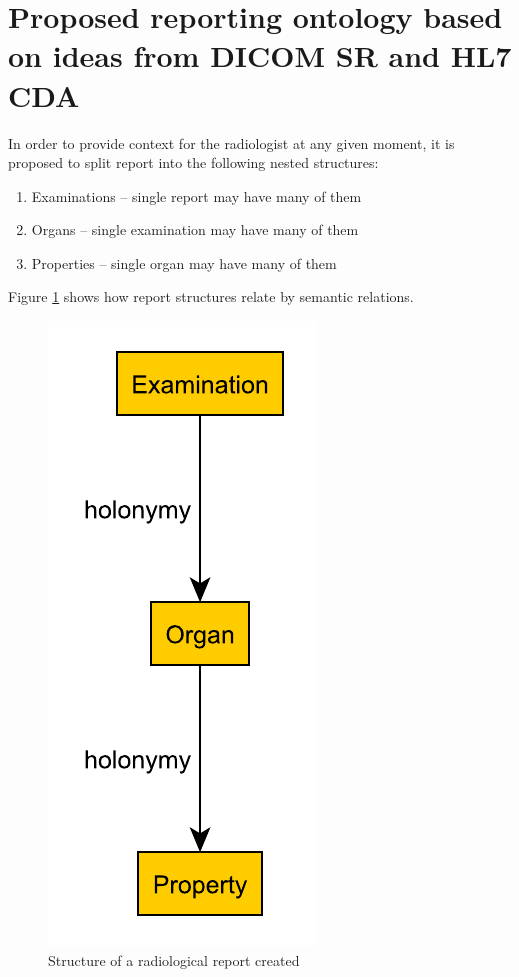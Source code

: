 \documentclass[12pt, twoside, openany]{report}
\theoremstyle{definition}
\begin{document}
\section{Proposed reporting ontology based on ideas from DICOM SR and HL7 CDA}
In order to provide context for the radiologist at any given moment, it is proposed to split report into the following nested structures:
\begin{enumerate}
    \item Examinations -- single report may have many of them
    \item Organs -- single examination may have many of them
    \item Properties -- single organ may have many of them
\end{enumerate}
Figure \ref{fig:report-semantic} shows how report structures relate by semantic relations.
\begin{figure}
    \centering
    \includegraphics{report-semantic.pdf}
    \caption{Structure of a radiological report created \label{fig:report-semantic}}
\end{figure}
\end{document}
